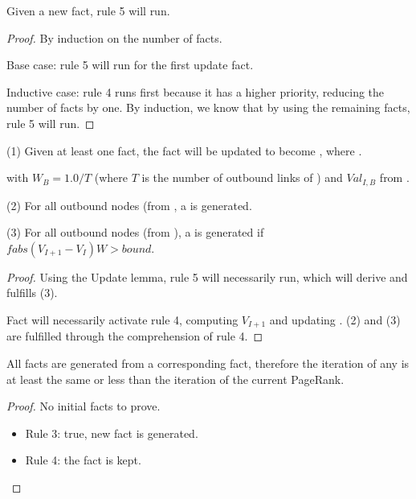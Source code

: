 \begin{lemma}
Given a new  fact, rule 5 will run.
\end{lemma}
\begin{proof}
By induction on the number of  facts.

Base case: rule 5 will run for the first update fact.

Inductive case: rule 4 runs first because it has a higher priority, reducing
the number of  facts by one. By induction, we know that by
using the remaining  facts, rule 5 will run.
\end{proof}

\begin{lemma}
(1) Given at least one  fact, the  fact will be updated to become , where .

with $W_{B} = 1.0/T$ (where $T$ is the number of outbound links of ) and
$Val_{I,B}$ from .

(2) For all  outbound nodes (from , a  is generated.

(3) For all  outbound nodes (from ), a  is generated if 
$fabs(V_{I + 1} - V_{I}) W > bound$.
\end{lemma}
\begin{proof}
Using the Update lemma, rule 5 will necessarily run, which will derive
 and
fulfills (3).

Fact  will necessarily activate rule 4, computing $V_{I+1}$ and
updating . (2) and (3) are fulfilled through the comprehension of
rule 4.

\end{proof}

\begin{invariant}
All  facts are generated from a corresponding
 fact, therefore the iteration of any
 is at least the same or less than the iteration of
the current PageRank.
\end{invariant}
\begin{proof}
No initial facts to prove.

\begin{itemize}
   \item Rule 3: true, new fact is generated.
   \item Rule 4: the fact is kept.
\end{itemize}
\end{proof}

